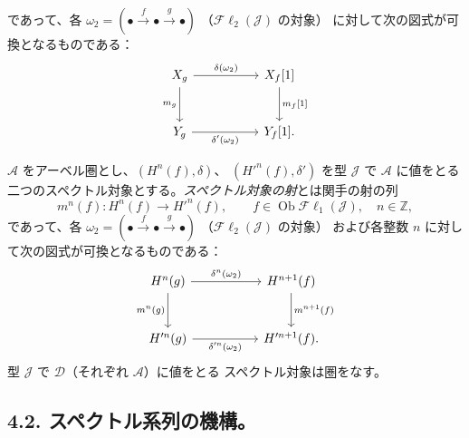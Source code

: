\clearpage
{}%
\begingroup\small\setlength{\parskip}{0pt}\setlength{\emergencystretch}{1.5em}
であって、各 $\omega_2=(\mathord\bullet\xrightarrow f\mathord\bullet\xrightarrow g\mathord\bullet)$
（$\mathcal{F}\ell_2(\mathcal J)$ の対象）
に対して次の図式が可換となるものである：
\[
\begin{tikzcd}[column sep=5.2em,row sep=2.7em]
X_g\arrow[r,"{\delta(\omega_2)}"]\arrow[d,"{m_g}"']&X_f[1]\arrow[d,"{m_f[1]}"]\\
Y_g\arrow[r,"{\delta'(\omega_2)}"']&Y_f[1].
\end{tikzcd}
\]

$\mathcal A$ をアーベル圏とし、$(H^n(f),\delta)$、
$(H'^{n}(f),\delta')$ を型 $\mathcal J$ で $\mathcal A$ に値をとる
二つのスペクトル対象とする。\emph{スペクトル対象の射}とは関手の射の列
\[
m^n(f)\colon H^n(f)\longrightarrow H'^{n}(f),\qquad
f\in\operatorname{Ob}\mathcal{F}\ell_1(\mathcal J),\quad n\in\mathbb Z,
\]
であって、各 $\omega_2=(\mathord\bullet\xrightarrow f\mathord\bullet\xrightarrow g\mathord\bullet)$
（$\mathcal{F}\ell_2(\mathcal J)$ の対象）
および各整数 $n$ に対して次の図式が可換となるものである：
\[
\begin{tikzcd}[column sep=5.2em,row sep=2.7em]
H^n(g)\arrow[r,"{\delta^n(\omega_2)}"]\arrow[d,"{m^n(g)}"']&
H^{n+1}(f)\arrow[d,"{m^{n+1}(f)}"]\\
H'^{n}(g)\arrow[r,"{\delta'^{n}(\omega_2)}"']&H'^{n+1}(f).
\end{tikzcd}
\]
型 $\mathcal J$ で $\mathcal D$（それぞれ $\mathcal A$）に値をとる
スペクトル対象は圏をなす。

\subsection*{4.2. スペクトル系列の機構。}

